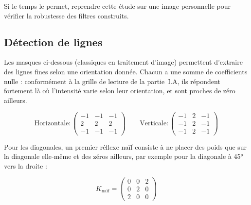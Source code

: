 \begin{shortcut}
Si le temps le permet, reprendre cette étude sur une image personnelle pour vérifier la robustesse des filtres construits.
\end{shortcut}

\subsection{Détection de lignes}

Les masques ci-dessous (classiques en traitement d'image) permettent d'extraire des lignes fines selon une orientation donnée. Chacun a une somme de coefficients nulle : conformément à la grille de lecture de la partie~I.A, ils répondent fortement là où l'intensité varie selon leur orientation, et sont proches de zéro ailleurs.

\[
\text{Horizontale} : \begin{pmatrix}-1&-1&-1\\2&2&2\\-1&-1&-1\end{pmatrix}
\qquad
\text{Verticale} : \begin{pmatrix}-1&2&-1\\-1&2&-1\\-1&2&-1\end{pmatrix}
\]


Pour les diagonales, un premier réflexe naïf consiste à ne placer des poids que sur la diagonale elle-même et des zéros ailleurs, par exemple pour la diagonale à 45° vers la droite :

\[
K_{\text{naïf}}=\begin{pmatrix}0&0&2\\0&2&0\\2&0&0\end{pmatrix}
\]



